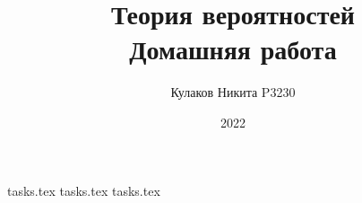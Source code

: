 
\title{Теория вероятностей\\ Домашняя работа}
\date{2022}
\author{Кулаков Никита P3230}



\maketitle

\begin{sloppypar}
\tableofcontents
\newpage
{tasks.tex}
{tasks.tex}
{tasks.tex}
\end{sloppypar}

